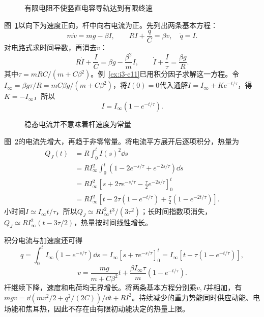 \begin{figure}[H]\centering
{}
\caption{有限电阻不使竖直电容导轨达到有限终速}\label{fig:i3-h9-q}
\end{figure}
\begin{solution}
图~\ref{fig:i3-h9-q}以向下为速度正向，杆中向右电流为正。先列出两条基本方程：
\[
m\dot v=mg-\beta I,\qquad RI+\frac qC=\beta v,\quad \dot q=I.
\]
对电路式求时间导数，再消去$\dot v$：
\[
R\dot I+\frac IC=\beta g-\frac{\beta^2}{m}I,\qquad
\dot I+\frac I\tau=\frac{\beta g}{R}.
\]
其中$\tau=mRC/(m+C\beta^2)$。例~\ref{ex:i3-e11}已用积分因子求解这一方程。令$I_\infty=\beta g\tau/R=mC\beta g/(m+C\beta^2)$，将$I(0)=0$代入通解$I=I_\infty+Ke^{-t/\tau}$，得$K=-I_\infty$，所以
\[
I=I_\infty(1-e^{-t/\tau}).
\]
\begin{figure}[H]\centering
{}
\caption{稳态电流并不意味着杆速度为常量}\label{fig:i3-h9-s}
\end{figure}
图~\ref{fig:i3-h9-s}的电流先增大，再趋于非零常量。将电流平方展开后逐项积分，热量为
\[
\begin{aligned}
Q_J(t)&=R\int_0^tI(s)^2\dd s\\
&=RI_\infty^2\int_0^t(1-2e^{-s/\tau}+e^{-2s/\tau})\dd s\\
&=RI_\infty^2\left[s+2\tau e^{-s/\tau}-\frac\tau2e^{-2s/\tau}\right]_0^t\\
&=\boxed{RI_\infty^2
\left[t-2\tau(1-e^{-t/\tau})
+\frac\tau2(1-e^{-2t/\tau})\right]}.
\end{aligned}
\]
小时间$I\simeq I_\infty t/\tau$，所以$Q_J\simeq RI_\infty^2t^3/(3\tau^2)$；长时间指数项消失，$Q_J\simeq RI_\infty^2(t-3\tau/2)$，热量按时间线性增长。

积分电流与加速度还可得
\[
q=\int_0^tI_\infty(1-e^{-s/\tau})\dd s
=I_\infty[s+\tau e^{-s/\tau}]_0^t
=I_\infty[t-\tau(1-e^{-t/\tau})],
\]
\[
v=\frac{mg}{m+C\beta^2}t+
\frac{\beta I_\infty\tau}{m}(1-e^{-t/\tau}).
\]
杆继续下降，速度和电荷均无界增长。将两条基本方程分别乘$v,I$并相加，有
$mgv=\dd(mv^2/2+q^2/(2C))/\dd t+RI^2$。持续减少的重力势能同时供应动能、电场能和焦耳热，因此不存在由有限初动能决定的热量上限。
\end{solution}

